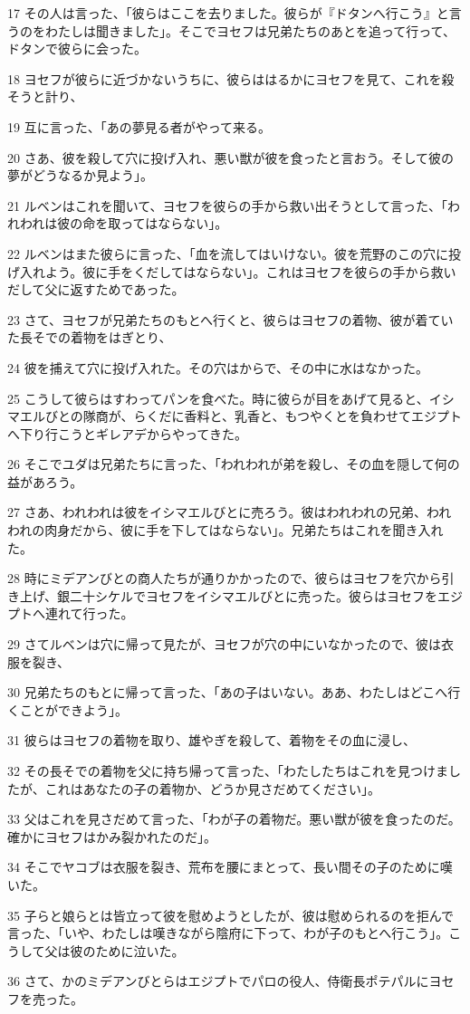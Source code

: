 \par 17 その人は言った、「彼らはここを去りました。彼らが『ドタンへ行こう』と言うのをわたしは聞きました」。そこでヨセフは兄弟たちのあとを追って行って、ドタンで彼らに会った。
\par 18 ヨセフが彼らに近づかないうちに、彼らははるかにヨセフを見て、これを殺そうと計り、
\par 19 互に言った、「あの夢見る者がやって来る。
\par 20 さあ、彼を殺して穴に投げ入れ、悪い獣が彼を食ったと言おう。そして彼の夢がどうなるか見よう」。
\par 21 ルベンはこれを聞いて、ヨセフを彼らの手から救い出そうとして言った、「われわれは彼の命を取ってはならない」。
\par 22 ルベンはまた彼らに言った、「血を流してはいけない。彼を荒野のこの穴に投げ入れよう。彼に手をくだしてはならない」。これはヨセフを彼らの手から救いだして父に返すためであった。
\par 23 さて、ヨセフが兄弟たちのもとへ行くと、彼らはヨセフの着物、彼が着ていた長そでの着物をはぎとり、
\par 24 彼を捕えて穴に投げ入れた。その穴はからで、その中に水はなかった。
\par 25 こうして彼らはすわってパンを食べた。時に彼らが目をあげて見ると、イシマエルびとの隊商が、らくだに香料と、乳香と、もつやくとを負わせてエジプトへ下り行こうとギレアデからやってきた。
\par 26 そこでユダは兄弟たちに言った、「われわれが弟を殺し、その血を隠して何の益があろう。
\par 27 さあ、われわれは彼をイシマエルびとに売ろう。彼はわれわれの兄弟、われわれの肉身だから、彼に手を下してはならない」。兄弟たちはこれを聞き入れた。
\par 28 時にミデアンびとの商人たちが通りかかったので、彼らはヨセフを穴から引き上げ、銀二十シケルでヨセフをイシマエルびとに売った。彼らはヨセフをエジプトへ連れて行った。
\par 29 さてルベンは穴に帰って見たが、ヨセフが穴の中にいなかったので、彼は衣服を裂き、
\par 30 兄弟たちのもとに帰って言った、「あの子はいない。ああ、わたしはどこへ行くことができよう」。
\par 31 彼らはヨセフの着物を取り、雄やぎを殺して、着物をその血に浸し、
\par 32 その長そでの着物を父に持ち帰って言った、「わたしたちはこれを見つけましたが、これはあなたの子の着物か、どうか見さだめてください」。
\par 33 父はこれを見さだめて言った、「わが子の着物だ。悪い獣が彼を食ったのだ。確かにヨセフはかみ裂かれたのだ」。
\par 34 そこでヤコブは衣服を裂き、荒布を腰にまとって、長い間その子のために嘆いた。
\par 35 子らと娘らとは皆立って彼を慰めようとしたが、彼は慰められるのを拒んで言った、「いや、わたしは嘆きながら陰府に下って、わが子のもとへ行こう」。こうして父は彼のために泣いた。
\par 36 さて、かのミデアンびとらはエジプトでパロの役人、侍衛長ポテパルにヨセフを売った。

